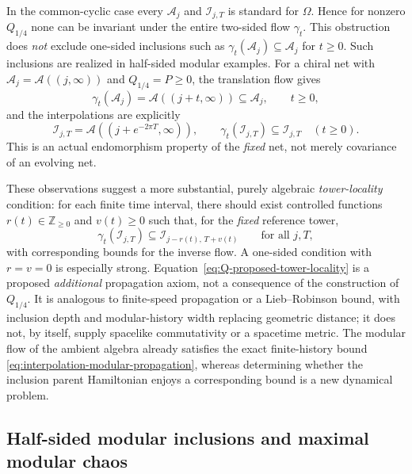 \documentclass[a4paper,11pt]{article}
\theoremstyle{definition}
\newcommand{\mA}{\mathcal{A}}%
\newcommand{\mN}{\mathcal{N}}
\newcommand{\mI}{\mathcal{I}}
\newcommand{\mM}{\mathcal{M}}
\begin{document}
In the common-cyclic case every $\mA_j$ and $\mI_{j,T}$ is
standard for $\Omega$. Hence for nonzero $Q_{1/4}$ none can be
invariant under the entire two-sided flow $\gamma_t$.
This obstruction does \emph{not} exclude one-sided inclusions such
as $\gamma_t(\mA_j)\subseteq\mA_j$ for $t\geq0$.
Such inclusions are realized in half-sided modular examples.
For a chiral net with $\mA_j=\mathcal A((j,\infty))$ and
$Q_{1/4}=P\geq0$, the translation flow gives
\begin{equation}
 \gamma_t(\mA_j)=\mathcal A((j+t,\infty))
 \subseteq\mA_j,\qquad t\geq0,
 \label{eq:Q-half-sided-tower-locality}
\end{equation}
and the interpolations are explicitly
\begin{equation}
 \mI_{j,T}=\mathcal A((j+e^{-2\pi T},\infty)),\qquad
 \gamma_t(\mI_{j,T})\subseteq\mI_{j,T}\quad(t\geq0).
 \label{eq:Q-half-sided-interpolation-locality}
\end{equation}
This is an actual endomorphism property of the \emph{fixed}
net, not merely covariance of an evolving net.

These observations suggest a more substantial, purely algebraic
\emph{tower-locality} condition: for each finite time interval,
there should exist controlled functions $r(t)\in\mathbb Z_{\geq0}$
and $v(t)\geq0$ such that, for the \emph{fixed} reference tower,
\begin{equation}
 \gamma_t(\mI_{j,T})
 \subseteq\mI_{j-r(t),\,T+v(t)}
 \qquad\text{for all }j,T,
 \label{eq:Q-proposed-tower-locality}
\end{equation}
with corresponding bounds for the inverse flow.
A one-sided condition with $r=v=0$ is especially strong.
Equation~\eqref{eq:Q-proposed-tower-locality} is a proposed
\emph{additional} propagation axiom, not a consequence of the
construction of $Q_{1/4}$. It is analogous to finite-speed
propagation or a Lieb--Robinson bound, with inclusion depth and
modular-history width replacing geometric distance; it does not,
by itself, supply spacelike commutativity or a spacetime metric.
The modular flow of the ambient algebra already satisfies the
exact finite-history bound
\eqref{eq:interpolation-modular-propagation}, whereas determining
whether the inclusion parent Hamiltonian enjoys a corresponding
bound is a new dynamical problem.



\subsection{Half-sided modular inclusions and maximal modular chaos}
\label{subsec:emergent-geometric-time}
\label{subsec:geometry-modular-ergodic}
\label{subsec:geometry-K-systems}
\end{document}
